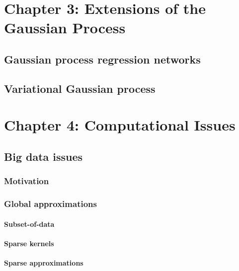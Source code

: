\documentclass[12pt]{article}
\begin{document}
\section{Chapter 3: Extensions of the Gaussian Process}




\subsection{Gaussian process regression networks \cite{gprn}}




\subsection{Variational Gaussian process \cite{vgp}}





\section{Chapter 4: Computational Issues}




\subsection{Big data issues \cite{big-data}}



\subsubsection{Motivation}



\subsubsection{Global approximations}


\paragraph{Subset-of-data}


\paragraph{Sparse kernels}


\paragraph{Sparse approximations}
\end{document}

